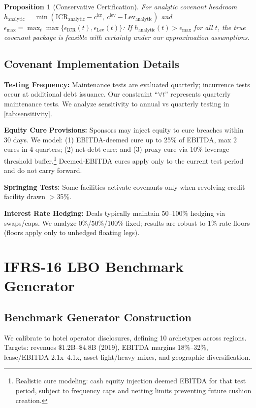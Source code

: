 \documentclass[11pt,a4paper]{article}
\newcommand{\ICR}{\mathrm{ICR}}
\newcommand{\Lev}{\mathrm{Lev}}
\theoremstyle{plain}
\newtheorem{proposition}{Proposition}
\theoremstyle{definition}
\newcommand{\cref}[1]{\ref{#1}}
\begin{document}
\begin{proposition}[Conservative Certification]\label{prop:certification}
For analytic covenant headroom $h_{\text{analytic}}=\min(\ICR_{\text{analytic}}-c^{\text{icr}},\, c^{\text{lev}}-\Lev_{\text{analytic}})$ and $\epsilon_{\max}=\max_t \max\{\epsilon_{\text{ICR}}(t),\epsilon_{\text{Lev}}(t)\}$:
If $h_{\text{analytic}}(t)>\epsilon_{\max}$ for all $t$, the true covenant package is feasible with certainty under our approximation assumptions.
\end{proposition}

\subsection{Covenant Implementation Details}

\textbf{Testing Frequency:} Maintenance tests are evaluated quarterly; incurrence tests occur at additional debt issuance. Our constraint ``$\forall t$'' represents quarterly maintenance tests. We analyze sensitivity to annual vs quarterly testing in \cref{tab:sensitivity}.

\textbf{Equity Cure Provisions:} Sponsors may inject equity to cure breaches within 30 days. We model: (1) EBITDA-deemed cure up to 25\% of EBITDA, max 2 cures in 4 quarters; (2) net-debt cure; and (3) proxy cure via 10\% leverage threshold buffer.\footnote{Realistic cure modeling: cash equity injection deemed EBITDA for that test period, subject to frequency caps and netting limits preventing future cushion creation.} Deemed-EBITDA cures apply only to the current test period and do not carry forward.

\textbf{Springing Tests:} Some facilities activate covenants only when revolving credit facility drawn $>$35\%.

\textbf{Interest Rate Hedging:} Deals typically maintain 50--100\% hedging via swaps/caps. We analyze 0\%/50\%/100\% fixed; results are robust to 1\% rate floors (floors apply only to unhedged floating legs).

\section{IFRS-16 LBO Benchmark Generator}

\subsection{Benchmark Generator Construction}

We calibrate to hotel operator disclosures, defining 10 archetypes across regions. Targets: revenues $\$1.2$B--$\$4.8$B (2019), EBITDA margins 18\%--32\%, lease/EBITDA 2.1x--4.1x, asset-light/heavy mixes, and geographic diversification.
\end{document}
